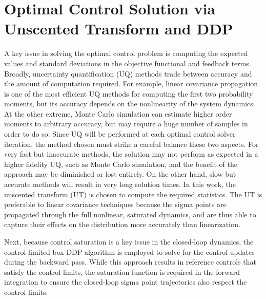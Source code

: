 \documentclass[journal ]{new-aiaa}
\begin{document}
\section*{Optimal Control Solution via Unscented Transform and DDP}
A key issue in solving the optimal control problem is computing the expected values and standard deviations in the objective functional and feedback terms. Broadly, uncertainty quantification (UQ) methods trade between accuracy and the amount of computation required. For example, linear covariance propagation is one of the most efficient UQ methods for computing the first two probability moments, but its accuracy depends on the nonlinearity of the system dynamics. At the other extreme, Monte Carlo simulation can estimate higher order moments to arbitrary accuracy, but may require a huge number of samples in order to do so. Since UQ will be performed at each optimal control solver iteration, the method chosen must strike a careful balance these two aspects. For very fast but inaccurate methods, the solution may not perform as expected in a higher fidelity UQ, such as Monte Carlo simulation, and the benefit of the approach may be diminished or lost entirely. On the other hand, slow but accurate methods will result in very long solution times. In this work, the unscented transform (UT) \cite{UT1997} is chosen to compute the required statistics. The UT is preferable to linear covariance techniques because the sigma points are propagated through the full nonlinear, saturated dynamics, and are thus able to capture their effects on the distribution more accurately than linearization. 

Next, because control saturation is a key issue in the closed-loop dynamics, the control-limited box-DDP algorithm \cite{DDP_ControlLimited} is employed to solve for the control updates during the backward pass. While this approach results in reference controls that satisfy the control limits, the saturation function is required in the forward integration to ensure the closed-loop sigma point trajectories also respect the control limits.
\end{document}
